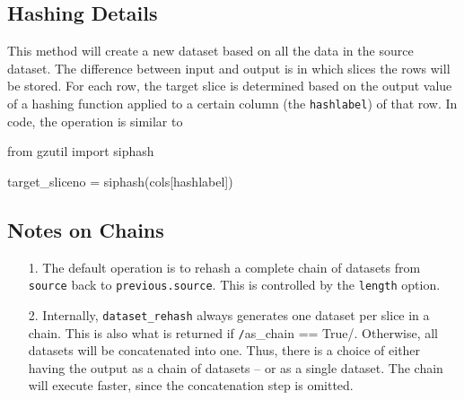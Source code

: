 \subsection{Hashing Details}
This method will create a new dataset based on all the data in the
source dataset.  The difference between input and output is in which
slices the rows will be stored.  For each row, the target slice is
determined based on the output value of a hashing function applied to
a certain column (the \texttt{hashlabel}) of that row.  In code, the
operation is similar to
\begin{python}
from gzutil import siphash

target_sliceno = siphash(cols[hashlabel]) %
\end{python}

\subsection{Notes on Chains}

\begin{enumerate}
  \item[1.]  The default operation is to rehash a complete chain of
    datasets from \texttt{source} back to \texttt{previous.source}.
    This is controlled by the \texttt{length} option.

  \item[2.]  Internally, \texttt{dataset\_rehash} always generates one
    dataset per slice in a chain.  This is also what is returned if
    \texttt/as_chain == True/.  Otherwise, all datasets
    will be concatenated into one.  Thus, there is a choice of either
    having the output as a chain of datasets -- or as a single dataset.
    The chain will execute faster, since the concatenation step is
    omitted.
\end{enumerate}



